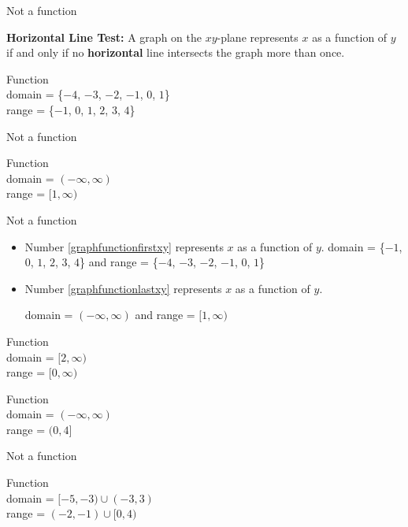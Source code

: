 \begin{exenum}
\item  Not a function

\item \textbf{Horizontal Line Test:} A graph on the $xy$-plane represents $x$ as a function of $y$ if and only if no \textbf{horizontal} line intersects the graph more than once.

\item Function \\ domain = \{$-4$, $-3$, $-2$, $-1$, $0$, $1$\} \\ range = \{$-1$, $0$, $1$, $2$, $3$, $4$\}

\item Not a function

\item Function \\ domain = $(-\infty, \infty)$ \\ range = $[1, \infty)$

\item Not a function 
      
\item 
\begin{itemize}

\item Number \ref{graphfunctionfirstxy} represents $x$ as a function of $y$.
domain  = \{$-1$, $0$, $1$, $2$, $3$, $4$\} and range = \{$-4$, $-3$, $-2$, $-1$, $0$, $1$\}

\item Number \ref{graphfunctionlastxy} represents $x$ as a function of $y$.

domain = $(-\infty, \infty)$  and range = $[1, \infty)$

\end{itemize}

\item Function \\ domain = $[2, \infty)$ \\ range = $[0, \infty)$

\item Function \\ domain = $(-\infty, \infty)$ \\ range = $(0, 4]$

\item Not a function

\item Function \\ domain = $[-5,-3) \cup(-3, 3)$ \\ range = $(-2, -1) \cup [0, 4)$


\end{exenum}
